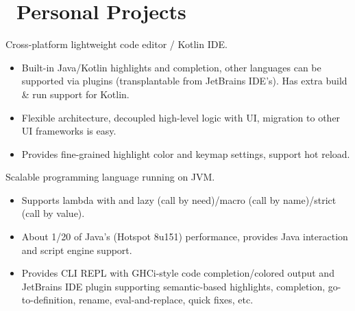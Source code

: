 \documentclass{resume}
\begin{document}
{\section{\faGithubAlt\ Personal Projects}
Cross-platform lightweight code editor / Kotlin IDE.
\begin{itemize}
  \item Built-in Java/Kotlin highlights and completion, other languages can be supported
    via plugins (transplantable from JetBrains IDE's).
    Has extra build \& run support for Kotlin.
  \item Flexible architecture, decoupled high-level logic with UI, migration to other UI frameworks is easy.
  \item Provides fine-grained highlight color and keymap settings, support hot reload.
\end{itemize}

Scalable programming language running on JVM.
\begin{itemize}
  \item Supports lambda with and lazy (call by need)/macro (call by name)/strict (call by value).
  \item About 1/20 of Java's (Hotspot 8u151) performance, provides Java interaction and script engine support.
  \item Provides CLI REPL with GHCi-style code completion/colored output and JetBrains
    IDE plugin supporting semantic-based highlights, completion, go-to-definition, rename, eval-and-replace, quick fixes, etc.
\end{itemize}

}
\end{document}
